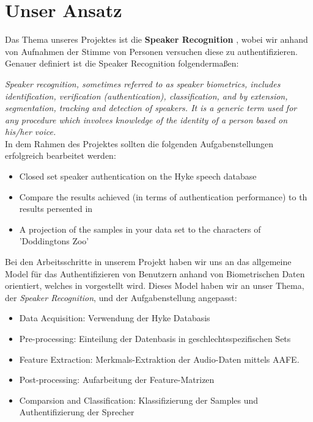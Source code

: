 \section{Unser Ansatz}
\label{approach}

Das Thema unseres Projektes ist die \textbf{Speaker Recognition} , wobei wir anhand von Aufnahmen der Stimme von Personen versuchen diese zu authentifizieren. Genauer definiert ist die Speaker Recognition folgendermaßen:


\textit{Speaker recognition, sometimes referred to as speaker biometrics, includes identification, verification (authentication), classification, and by extension, segmentation, tracking and detection of speakers. It is a generic term used for any procedure which
involves knowledge of the identity of a person based on his/her voice.}
\cite{beigi} \\


In dem Rahmen des Projektes sollten die folgenden Aufgabenstellungen erfolgreich bearbeitet werden:
\begin{itemize}
	\item[\textbullet] Closed set speaker authentication on the Hyke speech database
	\item[\textbullet] Compare the results achieved (in terms of authentication performance) to th results persented in \cite{hyke}
	\item[\textbullet]  A projection of the samples in your data set to the characters of 'Doddingtons Zoo' \cite{zoo}
\end{itemize}
 

Bei den Arbeitsschritte in unserem Projekt haben wir uns an das allgemeine Model für das Authentifizieren von Benutzern anhand von Biometrischen Daten orientiert, welches in \cite{vielhauer} vorgestellt wird. Dieses Model haben wir an unser Thema, der \textit{Speaker Recognition}, und der Aufgabenstellung angepasst:


\begin{itemize}
	\item[\textbullet] Data Acquisition: Verwendung der Hyke Databasis
	\item[\textbullet] Pre-processing: Einteilung der Datenbasis in geschlechtsspezifischen Sets
	\item[\textbullet] Feature Extraction: Merkmals-Extraktion der Audio-Daten mittels AAFE. 
	\item[\textbullet] Post-processing: Aufarbeitung der Feature-Matrizen
	\item[\textbullet] Comparsion and Classification: Klassifizierung der Samples und Authentifizierung der Sprecher
\end{itemize}


